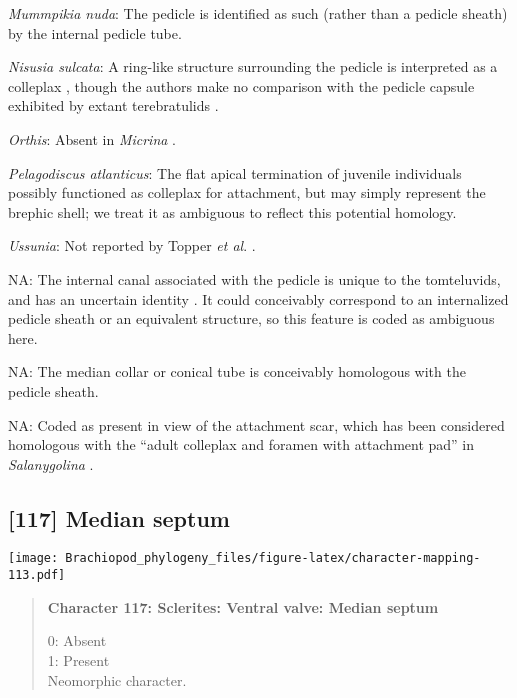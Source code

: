 \documentclass[openany]{book}
\theoremstyle{definition}
\theoremstyle{definition}
\theoremstyle{definition}
\theoremstyle{remark}
\begin{document}
\hypertarget{Mummpikia_nuda-coding-116}{}
\emph{Mummpikia nuda}: The pedicle is identified as such (rather than a
pedicle sheath) by the internal pedicle tube.

\hypertarget{Nisusia_sulcata-coding-116}{}
\emph{Nisusia sulcata}: A ring-like structure surrounding the pedicle is
interpreted as a colleplax \citep{Zhang2011Theexceptionally}, though the
authors make no comparison with the pedicle capsule exhibited by extant
terebratulids \citep[see][]{Holmer2018Evolutionarysignificance}.

\hypertarget{Orthis-coding-116}{}
\emph{Orthis}: Absent in \emph{Micrina} \citep{Holmer2011Firstrecord}.

\hypertarget{Pelagodiscus_atlanticus-coding-116}{}
\emph{Pelagodiscus atlanticus}: The flat apical termination of juvenile
individuals possibly functioned as colleplax for attachment, but may
simply represent the brephic shell; we treat it as ambiguous to reflect
this potential homology.

\hypertarget{Ussunia-coding-116}{}
\emph{Ussunia}: Not reported by Topper \emph{et al}.
\citeyearpar{Topper2013Reappraisalof}.

\hypertarget{NA-coding-116}{}
NA: The internal canal associated with the pedicle is unique to the
tomteluvids, and has an uncertain identity \citep{Streng2016Anew}. It
could conceivably correspond to an internalized pedicle sheath or an
equivalent structure, so this feature is coded as ambiguous here.

\hypertarget{NA-coding-116}{}
NA: The median collar or conical tube is conceivably homologous with the
pedicle sheath.

\hypertarget{NA-coding-116}{}
NA: Coded as present in view of the attachment scar, which has been
considered homologous with the ``adult colleplax and foramen with
attachment pad'' in \emph{Salanygolina} \citep{Popov2009Earlyontogeny}.

\subsection*{{[}117{]} Median septum}\label{median-septum}

\texttt{[image: Brachiopod\_phylogeny\_files/figure-latex/character-mapping-113.pdf]}

\begin{quote}
\textbf{Character 117: Sclerites: Ventral valve: Median septum}

0: Absent\\
1: Present\\
Neomorphic character.
\end{quote}
\end{document}
